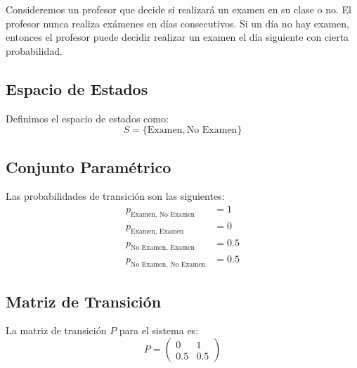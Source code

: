 \documentclass{article}
\begin{document}
Consideremos un profesor que decide si realizará un examen en su clase o no. El profesor nunca realiza exámenes en días consecutivos. Si un día no hay examen, entonces el profesor puede decidir realizar un examen el día siguiente con cierta probabilidad.

\subsection*{Espacio de Estados}
Definimos el espacio de estados como:
\[ S = \{ \text{Examen}, \text{No Examen} \} \]

\subsection*{Conjunto Paramétrico}
Las probabilidades de transición son las siguientes:
\begin{align*}
    p_{\text{Examen, No Examen}}    & = 1   \\
    p_{\text{Examen, Examen}}       & = 0   \\
    p_{\text{No Examen, Examen}}    & = 0.5 \\
    p_{\text{No Examen, No Examen}} & = 0.5
\end{align*}

\subsection*{Matriz de Transición}
La matriz de transición \( P \) para el sistema es:
\[ P = \begin{pmatrix}
        0   & 1   \\
        0.5 & 0.5
    \end{pmatrix} \]
\end{document}
